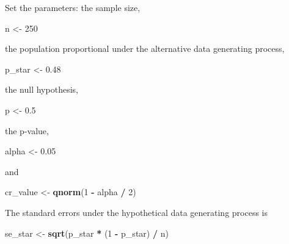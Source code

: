 \documentclass[]{book}
\newenvironment{Shaded}{\begin{snugshade}}{\end{snugshade}}
\newcommand{\DecValTok}[1]{\textcolor[rgb]{0.00,0.00,0.81}{#1}}
\newcommand{\FloatTok}[1]{\textcolor[rgb]{0.00,0.00,0.81}{#1}}
\newcommand{\KeywordTok}[1]{\textcolor[rgb]{0.13,0.29,0.53}{\textbf{#1}}}
\newcommand{\NormalTok}[1]{#1}
\newcommand{\OperatorTok}[1]{\textcolor[rgb]{0.81,0.36,0.00}{\textbf{#1}}}
\newcommand{\StringTok}[1]{\textcolor[rgb]{0.31,0.60,0.02}{#1}}
\theoremstyle{definition}
\theoremstyle{definition}
\theoremstyle{definition}
\theoremstyle{remark}
\begin{document}
Set the parameters: the sample size,

\begin{Shaded}
\begin{Highlighting}[]
\NormalTok{n <-}\StringTok{ }\DecValTok{250}
\end{Highlighting}
\end{Shaded}

the population proportional under the alternative data generating
process,

\begin{Shaded}
\begin{Highlighting}[]
\NormalTok{p_star <-}\StringTok{ }\FloatTok{0.48}
\end{Highlighting}
\end{Shaded}

the null hypothesis,

\begin{Shaded}
\begin{Highlighting}[]
\NormalTok{p <-}\StringTok{ }\FloatTok{0.5} 
\end{Highlighting}
\end{Shaded}

the p-value,

\begin{Shaded}
\begin{Highlighting}[]
\NormalTok{alpha <-}\StringTok{ }\FloatTok{0.05}
\end{Highlighting}
\end{Shaded}

and

\begin{Shaded}
\begin{Highlighting}[]
\NormalTok{cr_value <-}\StringTok{ }\KeywordTok{qnorm}\NormalTok{(}\DecValTok{1} \OperatorTok{-}\StringTok{ }\NormalTok{alpha }\OperatorTok{/}\StringTok{ }\DecValTok{2}\NormalTok{)}
\end{Highlighting}
\end{Shaded}

The standard errors under the hypothetical data generating process is

\begin{Shaded}
\begin{Highlighting}[]
\NormalTok{se_star <-}\StringTok{ }\KeywordTok{sqrt}\NormalTok{(p_star }\OperatorTok{*}\StringTok{ }\NormalTok{(}\DecValTok{1} \OperatorTok{-}\StringTok{ }\NormalTok{p_star) }\OperatorTok{/}\StringTok{ }\NormalTok{n)}
\end{Highlighting}
\end{Shaded}
\end{document}

